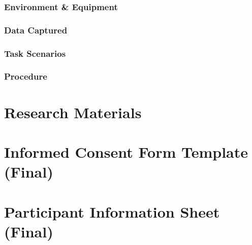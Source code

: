 \documentclass[a4paper,11pt]{article}
\begin{document}
\subsubsection*{Environment \& Equipment}
\subsubsection*{Data Captured}
\subsubsection*{Task Scenarios}
\subsubsection*{Procedure}

\newpage
\printbibliography[heading=bibintoc]

\newpage
\appendix
{}

\section{Research Materials}\label{app:research-materials}
% 

\newpage
\section{Informed Consent Form Template (Final)}\label{app:consent}
% 

\newpage
\section{Participant Information Sheet (Final)}\label{app:pis}
% 
\end{document}
